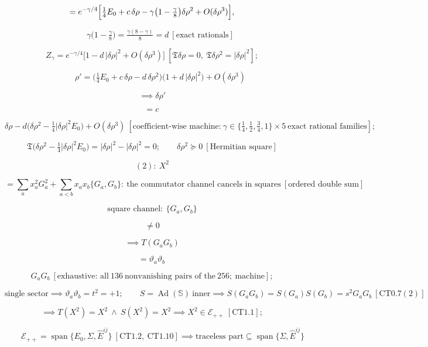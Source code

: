 \begin{theorem}
\[
=e^{-\gamma/4}\Bigl[\tfrac14E_0+c\,\delta\rho-\gamma\bigl(1-\tfrac\gamma8\bigr)\delta\rho^2+O(\delta\rho^3)\Bigr],
\]

\[
\qquad \gamma\bigl(1-\tfrac\gamma8\bigr)=\tfrac{\gamma(8-\gamma)}8=d\ [\text{exact rationals}]
\]

\[
Z_\gamma=e^{-\gamma/4}\bigl[1-d\,|\delta\rho|^2+O(\delta\rho^3)\bigr]\ [\mathfrak T\delta\rho=0,\ \mathfrak T\delta\rho^2=|\delta\rho|^2];
\]

\[
\qquad \rho'=\bigl(\tfrac14E_0+c\,\delta\rho-d\,\delta\rho^2\bigr)\bigl(1+d\,|\delta\rho|^2\bigr)+O(\delta\rho^3)
\]

\[
\implies\delta\rho'
\]

\[
= c\,
\]

\[
\delta\rho-d\bigl(\delta\rho^2-\tfrac14|\delta\rho|^2E_0\bigr)+O(\delta\rho^3)\ [\text{coefficient-wise machine:}\ \gamma\in\{\tfrac14,\tfrac12,\tfrac34,1\}\times5\ \text{exact rational families}];
\]

\[
\mathfrak T\bigl(\delta\rho^2-\tfrac14|\delta\rho|^2E_0\bigr)=|\delta\rho|^2-|\delta\rho|^2=0;\qquad
\delta\rho^2\succeq0\ [\text{Hermitian square}]
\]

\[
(2):\ X^2
\]

\[
= \textstyle\sum_ax_a^2G_a^2+\sum_{a<b}x_ax_b\{G_a,G_b\}:\ \text{the commutator channel cancels in squares}\ [\text{ordered double sum}]
\]

\[
\text{square channel}:\ \{G_a,G_b\}
\]

\[
\ne 0
\]

\[
\implies T(G_aG_b)
\]

\[
= \vartheta_a\vartheta_b\,
\]

\[
G_aG_b\ [\text{exhaustive: all}\ 136\ \text{nonvanishing pairs of the}\ 256;\ \text{machine}];
\]

\[
\text{single sector}\implies\vartheta_a\vartheta_b=t^2=+1;\qquad
S=\operatorname{Ad}(\mathbb S)\ \text{inner}\implies S(G_aG_b)=S(G_a)S(G_b)=s^2G_aG_b\ [\mathrm{CT0.7}(2)]
\]

\[
\implies T(X^2)=X^2\ \wedge\ S(X^2)=X^2\implies X^2\in\mathcal E_{++}\ [\mathrm{CT1.1}];
\]

\[
\qquad \mathcal E_{++}=\operatorname{span}\{E_0,\Sigma,\hat E^{ij}\}\ [\mathrm{CT1.2},\ \mathrm{CT1.10}]\implies\text{traceless part}\subseteq\operatorname{span}\{\Sigma,\hat E^{ij}\}
\]


\end{theorem}
